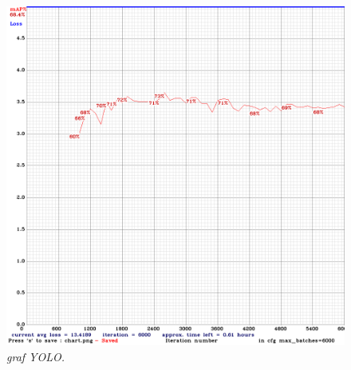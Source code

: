 \begin{figure}[h!]
\begin{center} 
\includegraphics[scale=0.35]{figures/chart_yolo-obj.png}
\caption{\small \sl graf YOLO. \label{fig:chart_yolo}}
\end{center}
\end{figure}